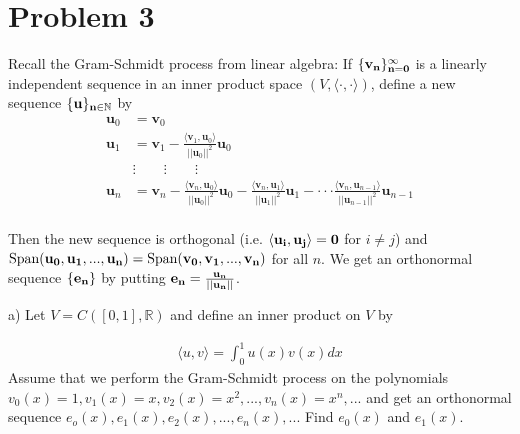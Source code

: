 \documentclass[12pt,letterpaper]{article}
\begin{document}
\newpage
\section*{Problem 3}
Recall the Gram-Schmidt process from linear algebra: If $\{ \bf{v}_n\}_{n=0}^\infty$ is a linearly independent sequence in an inner product space $(V, \langle\cdot,\cdot\rangle)$, define a new sequence $\{\bf{u}\}_{n\in\mathbb{N}}$ by
\\

\begin{align*}
	\mathbf{u}_0 &= \mathbf{v}_0 \\
	\mathbf{u}_1 &= \mathbf{v}_1 -\frac{\langle \mathbf{v}_1 , \mathbf{u}_0 \rangle}{||\mathbf{u}_0||^2} \mathbf{u}_0\\
	&\vdots \qquad \vdots \qquad \vdots \\
	\mathbf{u}_n &= \mathbf{v}_n-\frac{\langle \mathbf{v}_n , \mathbf{u}_0 \rangle}{||\mathbf{u}_0||^2} \mathbf{u}_0 -\frac{\langle \mathbf{v}_n , \mathbf{u}_1 \rangle}{||\mathbf{u}_1||^2} \mathbf{u}_1 - \cdot \cdot \cdot \frac{\langle \mathbf{v}_n , \mathbf{u}_{n-1} \rangle}{||\mathbf{u}_{n-1}||^2} \mathbf{u}_{n-1} \\
\end{align*}


\noindent
Then the new sequence is orthogonal (i.e. $\langle \bf{u}_i, \bf{u}_j \rangle = 0$ for $i \neq j$) and $\text{Span}(\bf{u}_0,\bf{u}_1,...,\bf{u}_n) = \text{Span}(\bf{v}_0,\bf{v}_1,...,\bf{v}_n) $ for all $n$. We get an orthonormal sequence $\{\bf{e}_n\}$ by putting $\bf{e}_n = \frac{\bf{u}_n}{||\bf{u}_n||}$.

\newpage
\medskip
\noindent
a) Let $V = C([0,1], \mathbb{R})$ and define an inner product on $V$ by

\begin{align*}
	\langle u, v \rangle = \int_0^1 u(x)v(x)dx
\end{align*}
Assume that we perform the Gram-Schmidt process on the polynomials $v_0(x)=1, v_1(x)=x, v_2(x)=x^2, ..., v_n(x) = x^n, ...$ and get an orthonormal sequence $e_o(x), e_1(x), e_2(x), ..., e_n(x),...$ Find $e_0(x)$ and $e_1(x)$.
\end{document}
